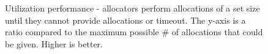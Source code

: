 \begin{figure}[t]
    \centering
    

    \caption{Utilization performance - allocators perform allocations of a set size until they cannot provide allocations or timeout.
    The y-axis is a ratio compared to the maximum possible \# of allocations that could be given. Higher is better.}
\end{figure}